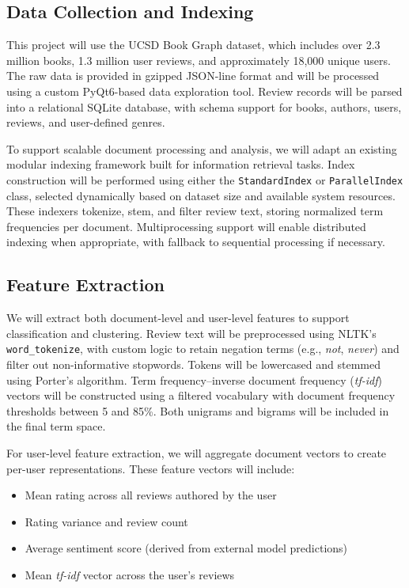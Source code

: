 \subsection{Data Collection and Indexing}
This project will use the UCSD Book Graph dataset, which includes over 2.3 million books, 1.3 million user reviews, and approximately 18,000 unique users. The raw data is provided in gzipped JSON-line format and will be processed using a custom PyQt6-based data exploration tool. Review records will be parsed into a relational SQLite database, with schema support for books, authors, users, reviews, and user-defined genres. 

To support scalable document processing and analysis, we will adapt an existing modular indexing framework built for information retrieval tasks. Index construction will be performed using either the \texttt{StandardIndex} or \texttt{ParallelIndex} class, selected dynamically based on dataset size and available system resources. These indexers tokenize, stem, and filter review text, storing normalized term frequencies per document. Multiprocessing support will enable distributed indexing when appropriate, with fallback to sequential processing if necessary.

\subsection{Feature Extraction}
We will extract both document-level and user-level features to support classification and clustering. Review text will be preprocessed using NLTK’s \texttt{word\_tokenize}, with custom logic to retain negation terms (e.g., \textit{not}, \textit{never}) and filter out non-informative stopwords. Tokens will be lowercased and stemmed using Porter’s algorithm. Term frequency–inverse document frequency (\textit{tf-idf}) vectors will be constructed using a filtered vocabulary with document frequency thresholds between 5 and 85\%. Both unigrams and bigrams will be included in the final term space.

For user-level feature extraction, we will aggregate document vectors to create per-user representations. These feature vectors will include:
\begin{itemize}
  \item Mean rating across all reviews authored by the user
  \item Rating variance and review count
  \item Average sentiment score (derived from external model predictions)
  \item Mean \textit{tf-idf} vector across the user’s reviews
\end{itemize}


